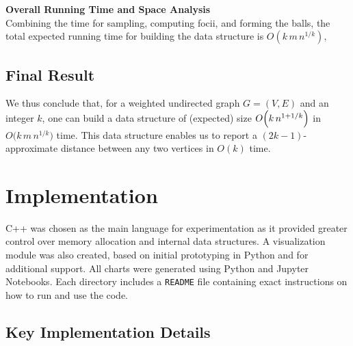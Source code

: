 \documentclass{article}
\begin{document}
\textbf{Overall Running Time and Space Analysis}\\
Combining the time for sampling, computing focii, and forming the balls, the total expected running time for building the data structure is
\({O}(k\,m\,n^{1/k}),
\)

\subsection{Final Result}
We thus conclude that, for a weighted undirected graph \(G=(V,E)\) and an integer \(k\), one can build a data structure of (expected) size \(O\Bigl(k\,n^{1+1/k}\Bigr)\) in \(O\bigl(k\,m\,n^{1/k}\bigr)\) time. This data structure enables us to report a \((2k-1)\)-approximate distance between any two vertices in \(O(k)\) time.

\section{Implementation}

C++ was chosen as the main language for experimentation as it provided greater control over memory allocation and internal data structures. A visualization module was also created, based on initial prototyping in Python and for additional support. All charts were generated using Python and Jupyter Notebooks. Each directory includes a \texttt{README} file containing exact instructions on how to run and use the code.

\subsection*{Key Implementation Details}
\end{document}
